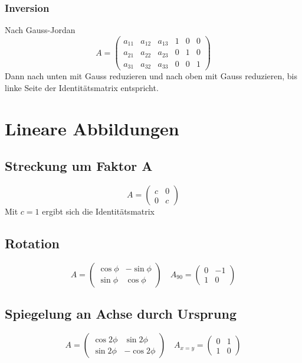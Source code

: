\documentclass{report}
\begin{document}
\subsection{Inversion}
Nach Gauss-Jordan
\begin{equation}A=\left(\begin{matrix}a_{11} & a_{12} & a_{13} & 1 & 0 & 0\\a_{21} & a_{22} & a_{23} & 0 & 1 & 0\\a_{31} & a_{32} & a_{33} & 0 & 0 & 1\end{matrix}\right)\end{equation}
Dann nach unten mit Gauss reduzieren und nach oben mit Gauss reduzieren, bis linke Seite der Identitätsmatrix entspricht.
\chapter{Lineare Abbildungen}
\section{Streckung um Faktor A}
\begin{equation}A=\left(\begin{matrix}c & 0\\0 & c\end{matrix}\right)\end{equation}
Mit $c = 1$ ergibt sich die Identitätsmatrix
\section{Rotation}
\begin{equation}A=\left(\begin{matrix}\cos{\phi} & -\sin{\phi}\\\sin{\phi} & \cos{\phi}\end{matrix}\right) \quad A_{90}=\left(\begin{matrix}0 & -1\\1 & 0\end{matrix}\right) \end{equation}
\section{Spiegelung an Achse durch Ursprung}
\begin{equation}A=\left(\begin{matrix}\cos{2 \phi} & \sin{2 \phi} \\ \sin{2\phi} & -\cos{2\phi}\end{matrix}\right) \quad A_{x=y}=\left(\begin{matrix}0 & 1\\1 & 0\end{matrix}\right)\end{equation}
\end{document}
